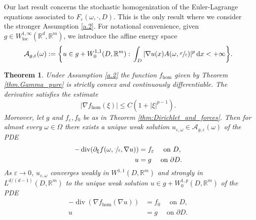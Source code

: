 \documentclass[11pt]{article}
\newcommand{\skpt}{\smallskip}
\numberwithin{equation}{section}
\DeclareMathOperator{\dive}{div}
\newtheorem{theorem}{Theorem}[section]
\theoremstyle{definition}
\let\e\varepsilon
\let\w\omega
\newcommand{\dx}{\,\mathrm{d}x}
\newcommand{\R}{\mathbb{R}}
\begin{document}
Our last result concerns the stochastic homogenization of the Euler-Lagrange equations associated to $F_{\e}(\w,\cdot,D)$. This is the only result where we consider the stronger Assumption \ref{a.2}. For notational convenience, given $g\in W^{1,\infty}_\mathrm{loc}(\R^d,\R^m)$, we introduce the affine energy space
\begin{equation*}
\mathcal{A}_{g,\e}(\w):=\biggl\{u\in g+W^{1,1}_0(D,\R^m):\,\int_D|\nabla u(x)A(\w,\sfrac{x}{\e})|^p\dx<+\infty\biggr\}.
\end{equation*}
\begin{theorem}\label{thm.PDEs}
Under Assumption \ref{a.2} the function $f_{\hom}$ given by Theorem \ref{thm.Gamma_pure} is strictly convex and continuously differentiable. The derivative satisfies the estimate
\begin{equation*}
|\nabla f_{\hom}(\xi)|\leq C(1+|\xi|^{p-1}).
\end{equation*}
Moreover, let $g$ and $f_{\e},f_0$ be as in Theorem \ref{thm:Dirichlet_and_forces}. Then for almost every $\w\in\Omega$ there exists a unique weak solution $u_{\e,\w}\in \mathcal{A}_{g,\e}(\w)$ of the PDE
\begin{equation}\label{eq:epsPDE}
\begin{split}-\dive(\partial_{\xi }f(\w,\sfrac{\cdot}{\e},\nabla u))&=f_{\e}\quad\text{ on }D,
\\
u&=g\quad\text{ on }\partial D.
\end{split}
\end{equation}
As $\e\to 0$, $u_{\e,\w}$ converges weakly in $W^{1,1}(D,\R^m)$ and strongly in $L^{d/(d-1)}(D,\R^m)$ to the unique weak solution $u\in g+W^{1,p}_0(D,\R^m)$ of the PDE
\begin{align*}
-\dive(\nabla f_{\hom}(\nabla u))&=f_0\quad\text{ on }D,
\\
u&=g\quad\text{ on }\partial D.
\end{align*}
\end{theorem}
\skpt
\end{document}
